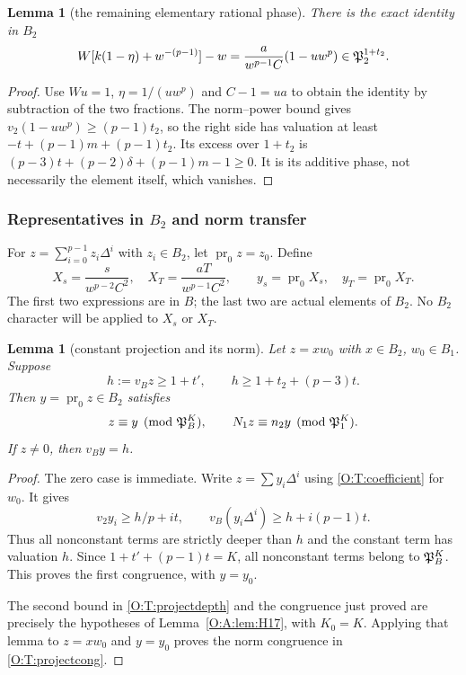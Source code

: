 \documentclass[11pt]{amsart}
\newtheorem{lemma}[theorem]{Lemma}
\theoremstyle{definition}
\theoremstyle{remark}
\newcommand{\pr}{\operatorname{pr}_0}\newcommand{\tr}{\operatorname{tr}}
\begin{document}
\begin{lemma}[the remaining elementary rational phase]\label{O:T:theta0}
There is the exact identity in $B_2$
\begin{equation}\label{O:T:Theta0}
 W[k(1-\eta)+w^{-(p-1)}]-w
 =\frac{a}{w^{p-1}C}(1-uw^p)\in\mathfrak P_2^{1+t_2}.
\end{equation}
\end{lemma}
\begin{proof}
Use $W u=1$, $\eta=1/(uw^p)$ and $C-1=ua$ to obtain the
identity by subtraction of the two fractions. The norm--power bound
gives $v_2(1-uw^p)\ge(p-1)t_2$, so the right side has valuation
at least $-t+(p-1)m+(p-1)t_2$. Its excess over $1+t_2$ is
$(p-3)t+(p-2)\delta+(p-1)m-1\ge0$.
It is its additive phase, not necessarily the element itself, which
vanishes.
\end{proof}

\subsubsection*{Representatives in $B_2$ and norm transfer}
For $z=\sum_{i=0}^{p-1}z_i\Delta^i$ with $z_i\in B_2$, let
$\pr z=z_0$. Define
\begin{equation}\label{O:T:XandY}
 X_s=\frac{s}{w^{p-2}C^2},\quad X_T=\frac{aT}{w^{p-1}C^2},
 \qquad y_s=\pr X_s,\quad y_T=\pr X_T.
\end{equation}
The first two expressions are in $B$; the last two are actual elements
of $B_2$. No $B_2$ character will be applied to $X_s$ or $X_T$.

\begin{lemma}[constant projection and its norm]\label{O:T:projection}
Let $z=xw_0$ with $x\in B_2$, $w_0\in B_1$. Suppose
\begin{equation}\label{O:T:projectdepth}
 h:=v_Bz\ge1+t',\qquad h\ge1+t_2+(p-3)t.
\end{equation}
Then $y=\pr z\in B_2$ satisfies
\begin{equation}\label{O:T:projectcong}
 z\equiv y\pmod{\mathfrak P_B^K},\qquad
 N_1z\equiv n_2y\pmod{\mathfrak P_1^K}.
\end{equation}
If $z\ne0$, then $v_By=h$.
\end{lemma}
\begin{proof}
The zero case is immediate. Write $z=\sum y_i\Delta^i$ using
\eqref{O:T:coefficient} for $w_0$. It gives
\[
 v_2y_i\ge h/p+it,\qquad
 v_B(y_i\Delta^i)\ge h+i(p-1)t.
\]
Thus all nonconstant terms are strictly deeper than $h$ and the
constant term has valuation $h$. Since
$1+t'+(p-1)t=K$, all nonconstant terms belong to $\mathfrak P_B^K$.
This proves the first congruence, with $y=y_0$.

The second bound in \eqref{O:T:projectdepth} and the congruence just
proved are precisely the hypotheses of Lemma~\ref{O:A:lem:H17}, with
$K_0=K$. Applying that lemma to $z=xw_0$ and $y=y_0$ proves the
norm congruence in \eqref{O:T:projectcong}.
\end{proof}
\end{document}
